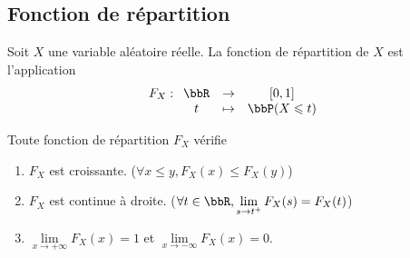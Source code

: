 \subsection{Fonction de répartition}

\begin{deff}
    Soit $X$ une variable aléatoire réelle.
    La fonction de répartition de $X$ est l'application
    \[ F_X:
        \begin{array}[t]{ccc}
            \bbR & \to & [0, 1]              \\
            t    & \tp & \bbP(X \leqslant t)
        \end{array}
    \]
\end{deff}

\begin{prop}
    Toute fonction de répartition $F_X$ vérifie
    \begin{enumerate}
        \item $F_X$ est croissante. ($\forall x \leqslant y, F_X(x) \leqslant F_X(y)$)
        \item $F_X$ est continue à droite. ($\forall t \in \bbR, \lim\limits_{s \to t^+} F_X(s) = F_X(t)$)
        \item $\lim\limits_{x \to +\infty} F_X(x) = 1$ et $\lim\limits_{x \to -\infty} F_X(x) = 0$.
    \end{enumerate}
\end{prop}

